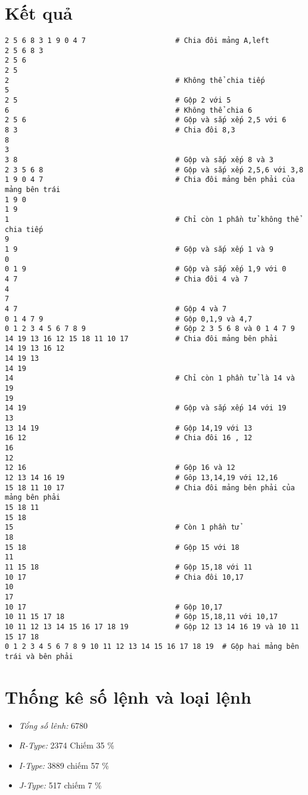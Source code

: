 \documentclass[a4paper]{article}
\begin{document}
\section{Kết quả}
\begin{verbatim}
2 5 6 8 3 1 9 0 4 7                     # Chia đôi mảng A,left
2 5 6 8 3 			
2 5 6 
2 5 
2                                       # Không thể chia tiếp
5 				
2 5                                     # Gộp 2 với 5
6                                       # Không thể chia 6
2 5 6                                   # Gộp và sắp xếp 2,5 với 6
8 3                                     # Chia đôi 8,3
8 
3 
3 8                                     # Gộp và sắp xếp 8 và 3
2 3 5 6 8                               # Gộp và sắp xếp 2,5,6 với 3,8
1 9 0 4 7                               # Chia đôi mảng bên phải của mảng bên trái
1 9 0 									
1 9 				
1                                       # Chỉ còn 1 phần tử không thể chia tiếp
9 
1 9                                     # Gộp và sắp xếp 1 và 9
0 				
0 1 9                                   # Gộp và sắp xếp 1,9 với 0
4 7                                     # Chia đôi 4 và 7
4 
7 
4 7                                     # Gộp 4 và 7
0 1 4 7 9                               # Gộp 0,1,9 và 4,7
0 1 2 3 4 5 6 7 8 9                     # Gộp 2 3 5 6 8 và 0 1 4 7 9
14 19 13 16 12 15 18 11 10 17           # Chia đôi mảng bên phải
14 19 13 16 12 
14 19 13 
14 19 
14                                      # Chỉ còn 1 phần tử là 14 và 19
19 
14 19                                   # Gộp và sắp xếp 14 với 19
13 			
13 14 19                                # Gộp 14,19 với 13
16 12                                   # Chia đôi 16 , 12
16 
12 			
12 16                                   # Gộp 16 và 12
12 13 14 16 19                          # Gôp 13,14,19 với 12,16
15 18 11 10 17                          # Chia đôi mảng bên phải của mảng bên phải
15 18 11 
15 18 
15                                      # Còn 1 phần tử
18 
15 18                                   # Gộp 15 với 18
11 
11 15 18                                # Gộp 15,18 với 11
10 17                                   # Chia đôi 10,17
10 
17 
10 17                                   # Gộp 10,17
10 11 15 17 18                          # Gộp 15,18,11 với 10,17
10 11 12 13 14 15 16 17 18 19           # Gộp 12 13 14 16 19 và 10 11 15 17 18
0 1 2 3 4 5 6 7 8 9 10 11 12 13 14 15 16 17 18 19  # Gộp hai mảng bên trái và bên phải
\end{verbatim}
\section{Thống kê số lệnh và loại lệnh}
\begin{itemize}
	\item \textit{Tổng số lênh: } 6780
	\item \textit{R-Type: } 2374 Chiếm 35 \%
	\item \textit{I-Type: }3889 chiếm 57 \%
	\item \textit{J-Type: }517 chiếm 7 \%
\end{itemize}
\end{document}

